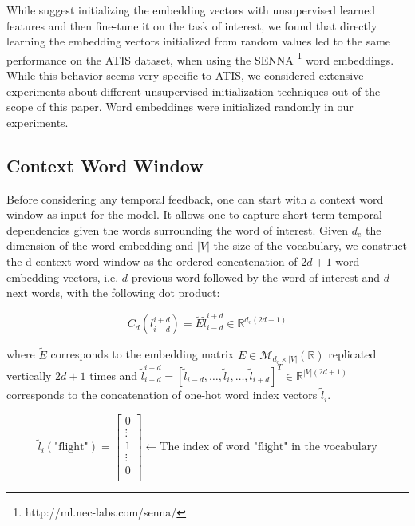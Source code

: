 While \citep{rnn15, rnn24} suggest initializing the embedding vectors with unsupervised
learned features and then fine-tune it on the task of interest, we found that
directly learning the embedding vectors initialized from random values led to
the same performance on the ATIS dataset, when using the SENNA
\footnote{http://ml.nec-labs.com/senna/} word embeddings. While this behavior
seems very specific to ATIS, we considered extensive experiments about
different unsupervised initialization techniques out of the scope of this
paper. Word embeddings were initialized randomly in our experiments.

\subsection{Context Word Window}

Before considering any temporal feedback, one can start with a context word
window as input for the model. It allows one to capture short-term temporal
dependencies given the words surrounding the word of interest. Given $d_e$ the
dimension of the word embedding and $|V|$ the size of the vocabulary, we
construct the d-context word window as the ordered concatenation of $2d+1$ word
embedding vectors, i.e. $d$ previous word followed by the word of interest and $d$
next words, with the following dot product:

\begin{equation}
C_{d}(l_{i-d}^{i+d}) = \tilde{E}\tilde{l}_{i-d}^{i+d}\in\mathbb{R}^{d_{e} (2d+1)}
\end{equation}

where $\tilde{E}$ corresponds to the embedding matrix
$E\in\mathcal{M}_{d_e\times|V|}(\mathbb{R})$ replicated vertically $2d+1$ times
and $\tilde{l}_{i-d}^{i+d}= [
\tilde{l}_{i-d},\dots,\tilde{l}_i,\dots,\tilde{l}_{i+d}]^T\in\mathbb{R}^{|V|(2d+1)}$
corresponds to the concatenation of one-hot word index vectors $\tilde{l}_i$.

\begin{equation}
\tilde{l}_{i}(\textrm{"flight"}) =
\begin{bmatrix}
0\\
\vdots\\
1\\
\vdots\\
0\\
\end{bmatrix} 
\leftarrow \textrm{The index of word "flight" in the vocabulary}
\end{equation}

